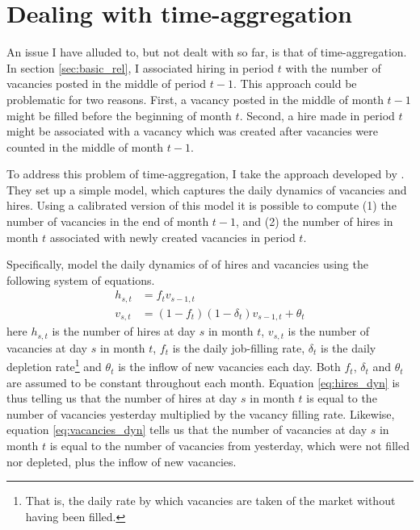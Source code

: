 \section{Dealing with time-aggregation}
\label{sec:time_agg}

An issue I have alluded to, but not dealt with so far, is that of time-aggregation. In section \ref{sec:basic_rel}, I associated 
 hiring in period $t$ with the number of vacancies posted in the middle of period $t-1$. This approach could be problematic for two reasons. First, a vacancy posted in the middle of month $t-1$ might be filled before the beginning of month $t$. Second, a hire made in period $t$ might be associated with a vacancy which was created after vacancies were counted in the middle of month $t-1$. 
 
To address this problem of time-aggregation, I take the approach developed by \cite{Davis2013}. They set up a simple model, which captures the daily dynamics of vacancies and hires. Using a calibrated version of this model it is possible to compute (1) the number of vacancies in the end of month $t-1$, and (2) the number of hires in month $t$ associated with newly created vacancies in period $t$. 

Specifically, \cite{Davis2013} model the daily dynamics of of hires and vacancies using the following system of equations.
\begin{align}
h_{s,t}&=f_t v_{s-1,t} \label{eq:hires_dyn} \\
v_{s,t}&=(1-f_t)(1-\delta_t)v_{s-1,t} + \theta_t \label{eq:vacancies_dyn} 
\end{align}
here $h_{s,t}$ is the number of hires at day $s$ in month $t$, $v_{s,t}$ is the number of vacancies at day $s$ in month $t$, $f_t$ is the daily job-filling rate, $\delta_t$ is the daily depletion rate\footnote{That is, the daily rate by which vacancies are taken of the market without having been filled.} and $\theta_t$ is the inflow of new vacancies each day. Both $f_t$, $\delta_t$ and $\theta_t$ are assumed to be constant throughout each month. Equation \eqref{eq:hires_dyn} is thus telling us that the number of hires at day $s$ in month $t$ is equal to the number of vacancies yesterday multiplied by the vacancy filling rate. Likewise, equation \eqref{eq:vacancies_dyn} tells us that the number of vacancies at day $s$ in  month $t$ is equal to the number of vacancies from yesterday, which were not filled nor depleted, plus the inflow of new vacancies. 

